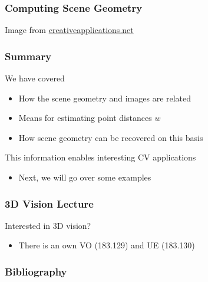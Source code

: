 \documentclass[xetex,professionalfont]{beamer}
\begin{document}

\begin{frame}
\frametitle{Computing Scene Geometry}

\begin{center}
    {\centering Image from \url{creativeapplications.net}}
\end{center}

\end{frame}


\begin{frame}
\frametitle{Summary}

We have covered
\begin{itemize}
    \item How the scene geometry and images are related
    \item Means for estimating point distances $w$
    \item How scene geometry can be recovered on this basis
\end{itemize}

\bigskip
This information enables interesting CV applications
\begin{itemize}
    \item Next, we will go over some examples
\end{itemize}

\end{frame}


\begin{frame}
\frametitle{3D Vision Lecture}

Interested in 3D vision?
\begin{itemize}
    \item There is an own VO (183.129) and UE (183.130)
\end{itemize}

\end{frame}


\begin{frame}
\frametitle{Bibliography}

\printbibliography

\end{frame}
\end{document}
